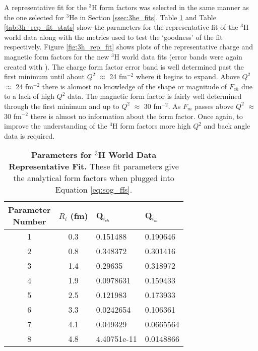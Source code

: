 A representative fit for the $^3$H form factors was selected in the same manner as the one selected for $^3$He in Section \ref{ssec:3he_fits}. Table \ref{tab:3h_rep_fit_pars} and Table \ref{tab:3h_rep_fit_stats} show the parameters for the representative fit of the $^3$H world data along with the metrics used to test the `goodness' of the fit respectively. Figure \ref{fig:3h_rep_fit} shows plots of the representative charge and magnetic form factors for the new $^3$H world data fits (error bands were again created with \cite{web_plot_digitizer}). The charge form factor error band is well determined past the first minimum until about $Q^2$ $\approx$ 24 fm$^{-2}$ where it begins to expand. Above $Q^2$ $\approx$ 24 fm$^{-2}$ there is alomost no knowledge of the shape or magnitude of $F_{ch}$ due to a lack of high $Q^2$ data. The magnetic form factor is fairly well determined through the first minimum and up to $Q^2$ $\approx$ 30 fm$^{-2}$. As $F_m$ passes above $Q^2$ $\approx$ 30 fm$^{-2}$ there is almost no information about the form factor. Once again, to improve the understanding of the $^3$H form factors more high $Q^2$ and back angle data is required.

\begin{table}[!h]
\centering
\begin{tabular}{|c c l l|}
\hline
\makecell{\textbf{Parameter}\\ \textbf{Number}} & \textbf{$R_i$ (fm)} & \textbf{Q$_{i_{ch}}$} & \textbf{Q$_{i_{m}}$}\\
\hline
1 & 0.3 & 0.151488 & 0.190646 \\
2 & 0.8 & 0.348372 & 0.301416 \\
3 & 1.4 & 0.29635 & 0.318972 \\
4 & 1.9 & 0.0978631 & 0.159433 \\
5 & 2.5 & 0.121983 & 0.173933 \\
6 & 3.3 & 0.0242654 & 0.106361 \\
7 & 4.1 & 0.049329 & 0.0665564 \\
8 & 4.8 & 4.40751e-11 & 0.0148866 \\          
\hline
\end{tabular}
\caption[Parameters for $^3$H World Data Representative Fit]{{\bf{Parameters for $^3$H World Data Representative Fit.}} These fit parameters give the analytical form factors when plugged into Equation \ref{eq:sog_ffs}.}
\label{tab:3h_rep_fit_pars}
\end{table}

